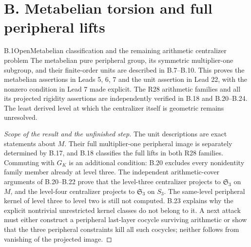 \section{B. Metabelian torsion and full peripheral lifts}

\begin{statement}{B.1}{Open}{Metabelian classification and the remaining arithmetic centralizer problem}
The metabelian pure peripheral group, its symmetric multiplier-one
subgroup, and their finite-order units are described in B.7--B.10.
This proves the metabelian assertions in Leads 5, 6, 7 and the unit
assertion in Lead 22, with the nonzero condition in Lead 7 made
explicit. The R28 arithmetic families and all its projected
rigidity assertions are independently verified in B.18 and
B.20--B.24. The least derived level at which the centralizer
itself is geometric remains unresolved.
\end{statement}
\begin{proof}[Scope of the result and the unfinished step]
The unit descriptions are exact statements about $M$. Their
full multiplier-one peripheral image is separately determined
by B.17, and B.18 classifies the full lifts in both R28 families.
Commuting with $G_K$ is an additional condition: B.20 excludes
every nonidentity family member already at level three.
The independent arithmetic-cover arguments of B.20--B.22 prove
that the level-three centralizer projects to $\mathfrak S_3$
on $M$, and the level-four centralizer projects to
$\mathfrak S_3$ on $S_3$. The same-level peripheral kernel of
level three to level two is still not computed. B.23 explains
why the explicit nontrivial unrestricted kernel classes do not
belong to it. A next attack must either construct a peripheral
last-layer cocycle surviving arithmetic or show that the three
peripheral constraints kill all such cocycles; neither follows
from vanishing of the projected image.
\end{proof}



